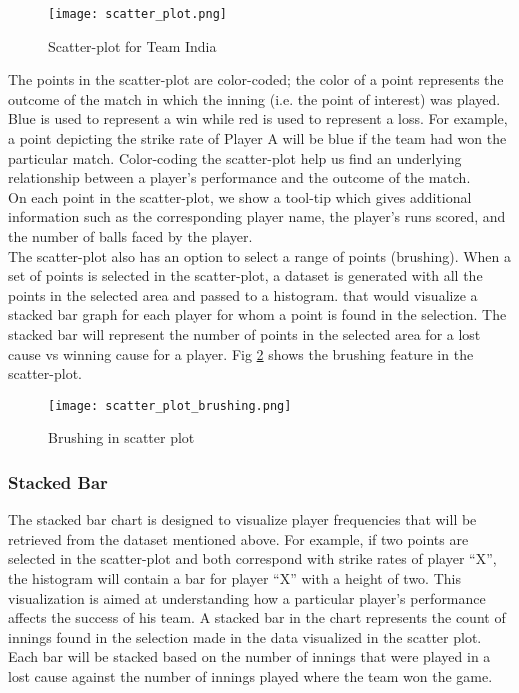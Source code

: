 \documentclass[10pt,journal,compsoc]{IEEEtran}
\begin{document}
\begin{figure}[ht]
\texttt{[image: scatter\_plot.png]}
\caption{Scatter-plot for Team India}
\label{fig:scatter_plot}
\end{figure}

\indent The points in the scatter-plot are color-coded; the color of a point represents the outcome of the match in which the inning (i.e. the point of interest) was played. Blue is used to represent a win while red is used to represent a loss. For example, a point depicting the strike rate of Player A will be blue if the team had won the particular match. Color-coding the scatter-plot help us find an underlying relationship between a player’s performance and the outcome of the match.\\

\indent On each point in the scatter-plot, we show a tool-tip which gives additional information such as the corresponding player name, the player’s runs scored, and the number of balls faced by the player.\\

\indent The scatter-plot also has an option to select a range of points (brushing). When a set of points is selected in the scatter-plot, a dataset is generated with all the points in the selected area and passed to a histogram. that would visualize a stacked bar graph for each player for whom a point is found in the selection. The stacked bar will represent the number of points in the selected area for a lost cause vs winning cause for a player. Fig \ref{fig:scatter_plot_brushing} shows the brushing feature in the scatter-plot.

\begin{figure}[ht]
\texttt{[image: scatter\_plot\_brushing.png]}
\caption{Brushing in scatter plot}
\label{fig:scatter_plot_brushing}
\end{figure}


\subsubsection {Stacked Bar}
The stacked bar chart is designed to visualize player frequencies that will be retrieved from the dataset mentioned above. For example, if two points are selected in the scatter-plot and both correspond with strike rates of player ``X'', the histogram will contain a bar for player ``X'' with a height of two. This visualization is aimed at understanding how a particular player's performance affects the success of his team. A stacked bar in the chart represents the count of innings found in the selection made in the data visualized in the scatter plot. Each bar will be stacked based on the number of innings that were played in a lost cause against the number of innings played where the team won the game.\\
\end{document}
